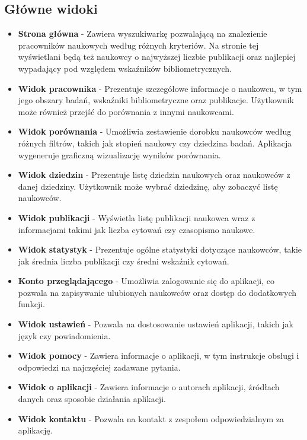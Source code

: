 \documentclass{article}
\begin{document}
\subsection{Główne widoki}
\begin{itemize}
  \item \textbf{Strona główna} - Zawiera wyszukiwarkę pozwalającą na znalezienie pracowników naukowych według różnych kryteriów. Na stronie tej wyświetlani będą też naukowcy o najwyższej liczbie publikacji oraz najlepiej wypadający pod względem wskaźników bibliometrycznych.
  \item \textbf{Widok pracownika} - Prezentuje szczegółowe informacje o naukowcu, w tym jego obszary badań, wskaźniki bibliometryczne oraz publikacje. Użytkownik może również przejść do porównania z innymi naukowcami.
  \item \textbf{Widok porównania} - Umożliwia zestawienie dorobku naukowców według różnych filtrów, takich jak stopień naukowy czy dziedzina badań. Aplikacja wygeneruje graficzną wizualizację wyników porównania.
  \item \textbf{Widok dziedzin} - Prezentuje listę dziedzin naukowych oraz naukowców z danej dziedziny. Użytkownik może wybrać dziedzinę, aby zobaczyć listę naukowców.
  \item \textbf{Widok publikacji} - Wyświetla listę publikacji naukowca wraz z informacjami takimi jak liczba cytowań czy czasopismo naukowe.
  \item \textbf{Widok statystyk} - Prezentuje ogólne statystyki dotyczące naukowców, takie jak średnia liczba publikacji czy średni wskaźnik cytowań.
  \item \textbf{Konto przeglądającego} - Umożliwia zalogowanie się do aplikacji, co pozwala na zapisywanie ulubionych naukowców oraz dostęp do dodatkowych funkcji.
  \item \textbf{Widok ustawień} - Pozwala na dostosowanie ustawień aplikacji, takich jak język czy powiadomienia.
  \item \textbf{Widok pomocy} - Zawiera informacje o aplikacji, w tym instrukcje obsługi i odpowiedzi na najczęściej zadawane pytania.
  \item \textbf{Widok o aplikacji} - Zawiera informacje o autorach aplikacji, źródłach danych oraz sposobie działania aplikacji.
  \item \textbf{Widok kontaktu} - Pozwala na kontakt z zespołem odpowiedzialnym za aplikację.
\end{itemize}
\end{document}
